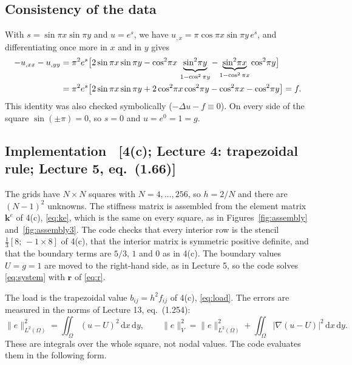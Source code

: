 \documentclass[11pt]{article}
\newcommand{\dxdy}{\,\mathrm{d}x\,\mathrm{d}y}
\newcommand{\norm}[1]{\lVert #1\rVert}
\newcommand{\abs}[1]{\lvert #1\rvert}
\newcommand{\Om}{\Omega}
\newcommand{\grad}{\nabla}
\newcommand{\lap}{\Delta}
\newcommand{\src}[1]{{\small\color{black!55}\textsf{[#1]}}}
\begin{document}
\subsection*{Consistency of the data}

With $s=\sin\pi x\sin\pi y$ and $u=e^{s}$, we have
$u_{,x}=\pi\cos\pi x\sin\pi y\,e^{s}$, and differentiating once more in $x$
and in $y$ gives
\begin{align}
  -u_{,xx}-u_{,yy}
  &=\pi^{2}e^{s}\bigl[2\sin\pi x\sin\pi y
     -\cos^{2}\!\pi x\,\underbrace{\sin^{2}\!\pi y}_{1-\cos^{2}\pi y}
     -\underbrace{\sin^{2}\!\pi x}_{1-\cos^{2}\pi x}\cos^{2}\!\pi y\bigr]\notag\\
  &=\pi^{2}e^{s}\bigl[2\sin\pi x\sin\pi y+2\cos^{2}\!\pi x\cos^{2}\!\pi y
     -\cos^{2}\!\pi x-\cos^{2}\!\pi y\bigr]=f .\label{eq:lap}
\end{align}
This identity was also checked symbolically ($-\lap u-f\equiv0$).  On every
side of the square $\sin(\pm\pi)=0$, so $s=0$ and $u=e^{0}=1=g$.

\subsection*{Implementation \ \src{4(c); Lecture 4: trapezoidal rule; Lecture 5, eq.~(1.66)}}

The grids have $N\times N$ squares with $N=4,\dots,256$, so $h=2/N$ and there
are $(N-1)^{2}$ unknowns.  The stiffness matrix is assembled from the element
matrix $\bm k^{e}$ of 4(c), \eqref{eq:ke}, which is the same on every square,
as in Figures~\ref{fig:assembly} and~\ref{fig:assembly3}.  The code
checks that every interior row is the stencil $\tfrac13[8;\,-1\times8]$ of
4(c), that the interior matrix is symmetric positive definite, and that the
boundary terms are $5/3$, $1$ and $0$ as in 4(c).  The boundary values
$U=g=1$ are moved to the right-hand side, as in Lecture 5, so the code solves
\eqref{eq:system} with $\bm r$ of \eqref{eq:r}.

The load is the trapezoidal value $b_{ij}=h^{2}f_{ij}$ of 4(c),
\eqref{eq:load}.  The errors are measured in the norms of Lecture 13,
eq.~(1.254):
\begin{equation}\label{eq:norms}
  \norm{e}_{L^{2}(\Om)}^{2}=\iint_{\Om}(u-U)^{2}\dxdy,
  \qquad
  \norm{e}_{V}^{2}=\norm{e}_{L^{2}(\Om)}^{2}+\iint_{\Om}\abs{\grad(u-U)}^{2}\dxdy .
\end{equation}
These are integrals over the whole square, not nodal values.  The code
evaluates them in the following form.
\end{document}
